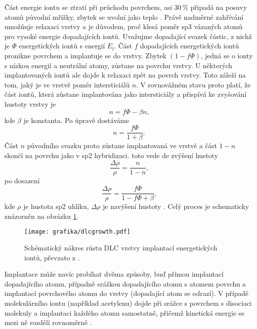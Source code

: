 Část energie iontu se ztratí při průchodu povrchem, asi 30\,\% připadá na posuvy atomů původní mřížky, zbytek se uvolní jako teplo \cite{Hofsass1998}. Právě nadměrné zahřívání umožňuje relaxaci vrstvy a je důvodem, proč klesá poměr sp3 vázaných atomů pro vysoké energie dopadajících iontů. Uvažujme dopadající svazek částic, z nichž je $\Phi$ energetických iontů s energií $E_\mathrm{i}$. Část $f$ dopadajících energetických iontů pronikne povrchem a implantuje se do vrstvy. Zbytek $(1-f \Phi)$, jedná se o ionty s nízkou energií a neutrální atomy, zůstane na povrchu vrstvy. U některých implantovaných iontů ale dojde k relaxaci zpět na povrch vrstvy. Toto záleží na tom, jaký je ve vrstvě poměr intersticiálů $n$. V rovnovážném stavu proto platí, že část iontů, která zůstane implantována jako intersticiály a přispívá ke zvyšování hustoty vrstvy je 
\begin{equation}
n = f \Phi - \beta n \text{,}
\end{equation}
kde $\beta$ je konstanta. Po úpravě dostáváme
\begin{equation}
n = \frac{f \Phi}{1 + \beta} \text{.}
\end{equation} 
Část $n$ původního svazku proto zůstane implantovaná ve vrstvě a část $1-n$ skončí na povrchu jako v sp2 hybridizaci. toto vede de zvýšení hustoty
\begin{equation}
\frac{\Delta \rho}{\rho} = \frac{n}{1-n} \text{,}
\end{equation}  
po dosazení
\begin{equation}
\frac{\Delta \rho}{\rho} = \frac{f \Phi}{1 - f \Phi + \beta} \text{,}
\end{equation}
kde $\rho$ je hustota sp2 uhlíku, $\Delta \rho$ je navýšení hustoty \cite{Robertson1994}. Celý proces je schematicky znázorněn na obrázku \ref{dlcgrowth}.

\begin{figure}[htbp]
  \centering
  \texttt{[image: grafika/dlcgrowth.pdf]}
  \caption{Schématický nákres růstu DLC vrstvy implantací energetických iontů, převzato z \cite{Robertson2002}.}
  \label{dlcgrowth}
\end{figure}

Implantace může navíc probíhat dvěma způsoby, buď přímou implantací dopadajícího atomu, případně srážkou dopadajícího atomu s atomem povrchu a implantací povrchového atomu do vrstvy (dopadající atom se odrazí). V případě molekulárního iontu (například acetylenu) dojde při srážce s povrchem s disociaci molekuly a implantaci každého atomu samostatně, přičemž kinetická energie se mezi ně rozdělí rovnoměrně \cite{Robertson2002}.

